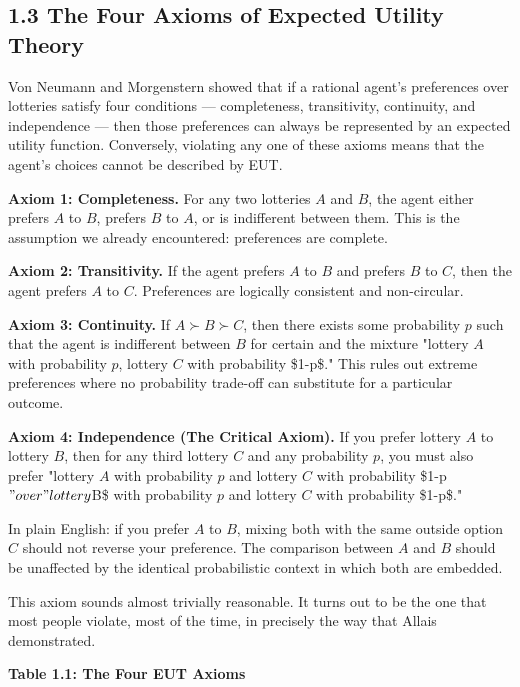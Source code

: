 \documentclass[12pt, letterpaper]{article}
\begin{document}
\subsection{1.3 The Four Axioms of Expected Utility Theory}


Von Neumann and Morgenstern showed that if a rational agent's preferences over lotteries satisfy four conditions --- completeness, transitivity, continuity, and independence --- then those preferences can always be represented by an expected utility function. Conversely, violating any one of these axioms means that the agent's choices cannot be described by EUT.

\textbf{Axiom 1: Completeness.} For any two lotteries $A$ and $B$, the agent either prefers $A$ to $B$, prefers $B$ to $A$, or is indifferent between them. This is the assumption we already encountered: preferences are complete.

\textbf{Axiom 2: Transitivity.} If the agent prefers $A$ to $B$ and prefers $B$ to $C$, then the agent prefers $A$ to $C$. Preferences are logically consistent and non-circular.

\textbf{Axiom 3: Continuity.} If $A \succ B \succ C$, then there exists some probability $p$ such that the agent is indifferent between $B$ for certain and the mixture "lottery $A$ with probability $p$, lottery $C$ with probability \$1-p\$." This rules out extreme preferences where no probability trade-off can substitute for a particular outcome.

\textbf{Axiom 4: Independence (The Critical Axiom).} If you prefer lottery $A$ to lottery $B$, then for any third lottery $C$ and any probability $p$, you must also prefer "lottery $A$ with probability $p$ and lottery $C$ with probability \$1-p$" over "lottery $B\$ with probability $p$ and lottery $C$ with probability \$1-p\$."

In plain English: if you prefer $A$ to $B$, mixing both with the same outside option $C$ should not reverse your preference. The comparison between $A$ and $B$ should be unaffected by the identical probabilistic context in which both are embedded.

This axiom sounds almost trivially reasonable. It turns out to be the one that most people violate, most of the time, in precisely the way that Allais demonstrated.

\textbf{Table 1.1: The Four EUT Axioms}
\end{document}
